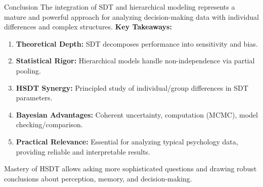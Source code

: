 \documentclass[aspectratio=169]{beamer}
\begin{document}
\begin{frame}{Conclusion}
    The integration of SDT and hierarchical modeling represents a mature and powerful approach for analyzing decision-making data with individual differences and complex structures.
    \pause
    \textbf{Key Takeaways:}
    \begin{enumerate}
        \item \textbf{Theoretical Depth:} SDT decomposes performance into sensitivity and bias.
        \item \textbf{Statistical Rigor:} Hierarchical models handle non-independence via partial pooling.
        \item \textbf{HSDT Synergy:} Principled study of individual/group differences in SDT parameters.
        \item \textbf{Bayesian Advantages:} Coherent uncertainty, computation (MCMC), model checking/comparison.
        \item \textbf{Practical Relevance:} Essential for analyzing typical psychology data, providing reliable and interpretable results.
    \end{enumerate}
    \pause
    \vfill
    Mastery of HSDT allows asking more sophisticated questions and drawing robust conclusions about perception, memory, and decision-making.
\end{frame}

\maketitle
\end{document}

